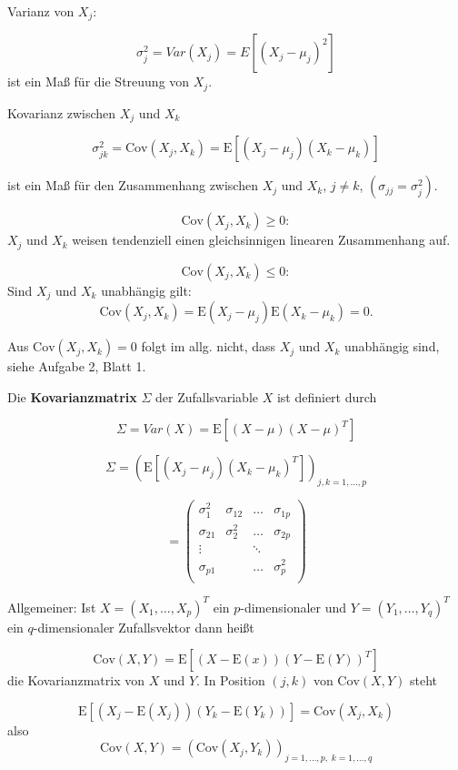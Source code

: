 \documentclass[12pt, a4paper]{article}
\newcommand{\E}{\mbox{I\negthinspace E}}
\theoremstyle{empty}
\newcommand{\1}{\mathds{1}}
\renewcommand{\E}{\mathrm{E}}
\newcommand{\Cov}{\mathrm{Cov}}
\begin{document}
Varianz von $X_j$:

\[  \sigma_j^2 = Var(X_j) = E[(X_j - \mu_j)^2]     \] ist ein Maß für die Streuung von $X_j$.

Kovarianz zwischen $X_j$ und $X_k$ 

\[  \sigma_{jk}^2 = \Cov(X_j, X_k) = \E[(X_j - \mu_j)(X_k - \mu_k )]   \]

ist ein Maß für den Zusammenhang zwischen $X_j$ und $X_k$, $j \neq k$, $(\sigma_{jj} = \sigma_j^2)$.

\[ \Cov (X_j, X_k) \geq 0:   \] $X_j$ und $X_k$ weisen tendenziell einen gleichsinnigen linearen Zusammenhang auf.

\[ \Cov (X_j, X_k) \leq 0:  \] Sind $X_j$ und $X_k$ unabhängig gilt:
\[  \Cov (X_j, X_k) = \E(X_j - \mu_j) \E(X_k - \mu_k)   = 0. \]

Aus $\Cov(X_j, X_k) = 0$ folgt im allg. nicht, dass $X_j$ und $X_k$ unabhängig sind, siehe Aufgabe 2, Blatt 1.

Die \textbf{Kovarianzmatrix} $\Sigma$ der Zufallsvariable $X$ ist definiert durch 

\[ \Sigma = Var(X) =  \E[(X-\mu)(X - \mu)^T] \]

\[ \Sigma =   (\E[(X_j - \mu_j)(X_k - \mu_k)^T])_{j,k = 1,\ldots,p} \]

\[= \begin{pmatrix}

\sigma_1^2 & \sigma_{12} & \ldots & \sigma_{1p} \\
\sigma_{21} & \sigma_2^2 & \ldots & \sigma_{2p} \\
\vdots & & \ddots  & \\
\sigma_{p1} && \ldots & \sigma_{p}^2 \\

\end{pmatrix}  \]


Allgemeiner: Ist $X = (X_1, \ldots, X_p)^T$ ein $p$-dimensionaler und $Y = (Y_1, \ldots, Y_q)^T$ ein $q$-dimensionaler Zufallsvektor dann heißt

\[ \Cov(X,Y) = \E[(X-\E(x))(Y-\E(Y))^T  ]  \] die Kovarianzmatrix von $X$ und $Y$. In Position $(j,k)$ von $ \Cov(X,Y) $ steht

\[ \E [(X_j - \E(X_j))(Y_k - \E(Y_k)) ] = \Cov(X_j, X_k) \] also \[ \Cov(X,Y) = (\Cov(X_j, Y_k))_{j = 1, \ldots, p, \; k = 1, \ldots, q} \]
\end{document}

